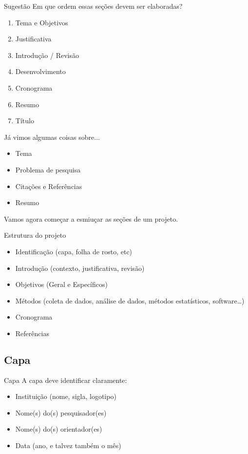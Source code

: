\documentclass{beamer}
\begin{document}
\begin{frame}{Sugestão}
Em que ordem essas seções devem ser elaboradas?
\begin{enumerate}
\item Tema e Objetivos
\item Justificativa
\item Introdução / Revisão
\item Desenvolvimento
\item Cronograma
\item Resumo
\item Título
\end{enumerate}
\end{frame}

\begin{frame}{Já vimos algumas coisas sobre...}
  \begin{itemize}
  \item<1-> Tema
  \item<1-> Problema de pesquisa
  \item<1-> Citações e Referências
  \item<1-> Resumo
  \end{itemize}

  Vamos agora começar a esmiuçar as seções de um projeto.
\end{frame}

\begin{frame}{Estrutura do projeto}
  \begin{itemize}
  \item<1-> Identificação (capa, folha de rosto, etc)
  \item<1-> Introdução (contexto, justificativa, revisão)
  \item<1-> Objetivos (Geral e Específicos)
  \item<1-> Métodos (coleta de dados, análise de dados, métodos estatísticos, software\ldots)
  \item<1-> Cronograma
  \item<1-> Referências
  \end{itemize}
\end{frame}

\subsection{Capa}

\begin{frame}{Capa}
A capa deve identificar claramente:
  \begin{itemize}
  \item Instituição (nome, sigla, logotipo)
  \item Nome(s) do(s) pesquisador(es)
  \item Nome(s) do(s) orientador(es)
  \item Data (ano, e talvez também o mês)
  \end{itemize}
\end{frame}
\end{document}
